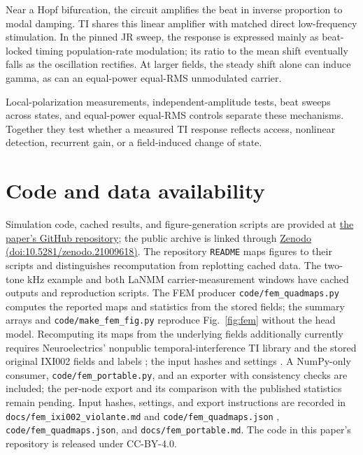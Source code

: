 \documentclass[11pt,a4paper]{article}
\providecommand{\DIFaddtex}[1]{{\protect\color{blue} \sf #1}} %
\providecommand{\DIFdeltex}[1]{{\protect\color{red} \scriptsize #1}} %
\providecommand{\DIFaddbegin}{} %
\providecommand{\DIFaddend}{} %
\providecommand{\DIFdelbegin}{} %
\providecommand{\DIFdelend}{} %
\providecommand{\DIFadd}[1]{\texorpdfstring{\DIFaddtex{#1}}{#1}} %
\providecommand{\DIFdel}[1]{\texorpdfstring{\DIFdeltex{#1}}{}} %
\begin{document}
Near a Hopf bifurcation, the circuit amplifies the beat in inverse proportion
to modal damping. TI shares this linear amplifier with matched direct
low-frequency stimulation. In the pinned JR sweep, the response is expressed
mainly as beat-locked \DIFdelbegin \DIFdel{timing}\DIFdelend \DIFaddbegin \DIFadd{population-rate modulation}\DIFaddend ; its ratio to the mean shift eventually falls
as the oscillation rectifies. At larger fields, the steady shift alone can
induce gamma, as can an \DIFdelbegin \DIFdel{equal-power }\DIFdelend \DIFaddbegin \DIFadd{equal-RMS }\DIFaddend unmodulated carrier.

Local-polarization measurements, independent-amplitude tests, beat sweeps
across states, and \DIFdelbegin \DIFdel{equal-power }\DIFdelend \DIFaddbegin \DIFadd{equal-RMS }\DIFaddend controls separate these mechanisms.
Together they test whether a measured TI response reflects access,
nonlinear detection, recurrent gain, or a field-induced change of state.

\section*{Code and data availability}
Simulation code, cached results, and figure-generation scripts are provided at
\href{https://github.com/giulioruffini/TI-demodulation-paper}{the paper's GitHub repository};
the public archive is linked through
\href{https://doi.org/10.5281/zenodo.21009618}{Zenodo (doi:10.5281/zenodo.21009618)}.
The repository \texttt{README} maps figures to their scripts and distinguishes
recomputation from replotting cached data. The two-tone kHz example and both LaNMM carrier-measurement windows have
cached outputs and reproduction scripts. The FEM producer \texttt{code/fem\_quadmaps.py} computes the reported maps
and statistics from the stored fields; the summary arrays and
\texttt{code/make\_fem\_fig.py} reproduce Fig.~\ref{fig:fem} without the head model. Recomputing its maps
from the underlying fields \DIFdelbegin \DIFdel{additionally }\DIFdelend \DIFaddbegin \DIFadd{currently }\DIFaddend requires Neuroelectrics' nonpublic
\DIFdelbegin \DIFdel{temporal-interference }\DIFdelend \DIFaddbegin \DIFadd{TI }\DIFaddend library and the \DIFdelbegin \DIFdel{stored }\DIFdelend \DIFaddbegin \DIFadd{original }\DIFaddend IXI002 fields and labels\DIFdelbegin \DIFdel{;
the input hashes and settings }\DIFdelend \DIFaddbegin \DIFadd{. A NumPy-only consumer,
\texttt{code/fem\_portable.py}, and an exporter with consistency checks are included;
the per-node export and its comparison with the published statistics remain
pending. Input hashes, settings, and export instructions }\DIFaddend are recorded in
\texttt{docs/fem\_ixi002\_violante.md}\DIFdelbegin \DIFdel{and \texttt{code/fem\_quadmaps.json}}\DIFdelend \DIFaddbegin \DIFadd{, \texttt{code/fem\_quadmaps.json},
and \texttt{docs/fem\_portable.md}}\DIFaddend .
The code in this paper's repository is released under CC-BY-4.0.
\end{document}
